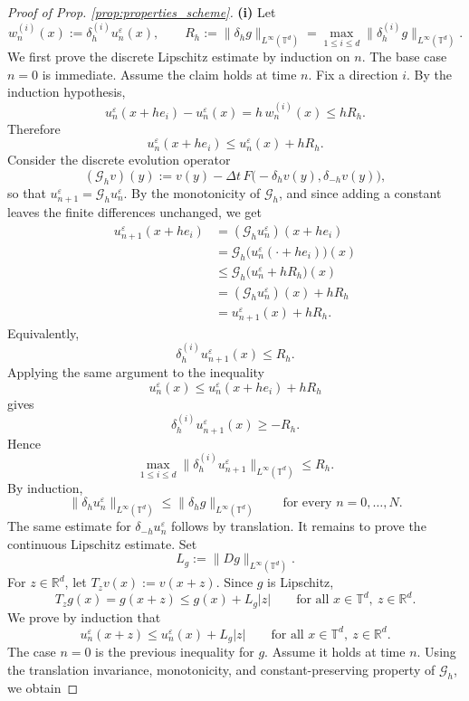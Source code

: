 \documentclass[10pt,a4paper]{amsart}
\newcommand{\R}{\mathbb{R}}
\newcommand{\T}{{\mathbb{T}}}
\begin{document}
\begin{proof}[Proof of Prop. \ref{prop:properties_scheme}]	

\noindent\textbf{(i)}
Let
\[
w_n^{(i)}(x):=\delta_h^{(i)}u_n^\varepsilon(x),\qquad
R_h:=\|\delta_h g\|_{L^\infty(\T^d)}
=\max_{1\le i\le d}\|\delta_h^{(i)}g\|_{L^\infty(\T^d)} .
\]
We first prove the discrete Lipschitz estimate by induction on \(n\). The base case
\(n=0\) is immediate. Assume the claim holds at time \(n\). Fix a direction \(i\).
By the induction hypothesis,
\[
u_n^\varepsilon(x+h e_i)-u_n^\varepsilon(x)
=h\,w_n^{(i)}(x)\le hR_h .
\]
Therefore
\[
u_n^\varepsilon(x+h e_i)\le u_n^\varepsilon(x)+hR_h .
\]
Consider the discrete evolution operator
\[
(\mathcal G_h v)(y):=
v(y)-\Delta t\,F\big(-\delta_h v(y),\delta_{-h}v(y)\big),
\]
so that \(u_{n+1}^\varepsilon=\mathcal G_h u_n^\varepsilon\). By the monotonicity of
\(\mathcal G_h\), and since adding a constant leaves the finite differences unchanged, we get
\[
\begin{aligned}
u_{n+1}^\varepsilon(x+h e_i)
&=(\mathcal G_h u_n^\varepsilon)(x+h e_i)  \\
&=\mathcal G_h\big(u_n^\varepsilon(\cdot+h e_i)\big)(x) \\
&\le \mathcal G_h\big(u_n^\varepsilon+hR_h\big)(x) \\
&=(\mathcal G_h u_n^\varepsilon)(x)+hR_h \\
&=u_{n+1}^\varepsilon(x)+hR_h .
\end{aligned}
\]
Equivalently,
\[
\delta_h^{(i)}u_{n+1}^\varepsilon(x)\le R_h .
\]
Applying the same argument to the inequality
\[
u_n^\varepsilon(x)\le u_n^\varepsilon(x+h e_i)+hR_h
\]
gives
\[
\delta_h^{(i)}u_{n+1}^\varepsilon(x)\ge -R_h .
\]
Hence
\[
\max_{1\le i\le d}
\|\delta_h^{(i)}u_{n+1}^\varepsilon\|_{L^\infty(\T^d)}
\le R_h .
\]
By induction,
\[
\|\delta_h u_n^\varepsilon\|_{L^\infty(\T^d)}
\le \|\delta_h g\|_{L^\infty(\T^d)}
\qquad\text{for every }n=0,\ldots,N .
\]
The same estimate for \(\delta_{-h}u_n^\varepsilon\) follows by translation.
It remains to prove the continuous Lipschitz estimate. Set
\[
L_g:=\|Dg\|_{L^\infty(\T^d)} .
\]
For \(z\in\R^d\), let \(T_zv(x):=v(x+z)\). Since \(g\) is Lipschitz,
\[
T_zg(x)=g(x+z)\le g(x)+L_g|z|
\qquad\text{for all }x\in\T^d,\ z\in\R^d .
\]
We prove by induction that
\[
u_n^\varepsilon(x+z)\le u_n^\varepsilon(x)+L_g|z|
\qquad\text{for all }x\in\T^d,\ z\in\R^d .
\]
The case \(n=0\) is the previous inequality for \(g\). Assume it holds at time \(n\).
Using the translation invariance, monotonicity, and constant-preserving property of
\(\mathcal G_h\), we obtain

\end{proof}
\end{document}
